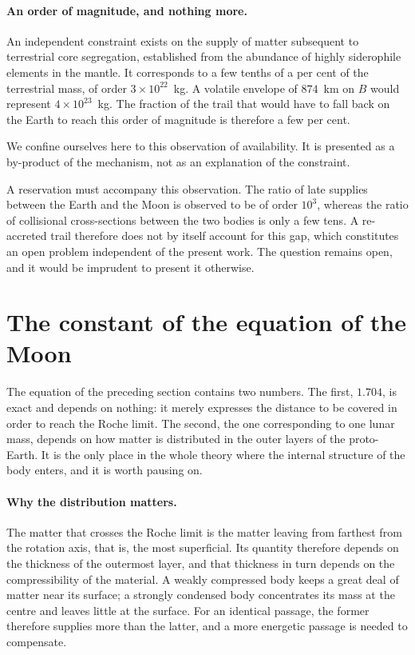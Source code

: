 \documentclass[11pt,a4paper,openany]{report}
\begin{document}
\paragraph{An order of magnitude, and nothing more.} An independent constraint exists on the supply
of matter subsequent to terrestrial core segregation, established from the abundance of highly
siderophile elements in the mantle. It corresponds to a few tenths of a per cent of the terrestrial
mass, of order $3\times10^{22}$~kg. A volatile envelope of $874$~km on $B$ would represent
$4\times10^{23}$~kg. The fraction of the trail that would have to fall back on the Earth to reach
this order of magnitude is therefore a few per cent.

We confine ourselves here to this observation of availability. It is presented as a by-product of the
mechanism, not as an explanation of the constraint.

\begin{controle}
A reservation must accompany this observation. The ratio of late supplies between the Earth and the
Moon is observed to be of order $10^{3}$, whereas the ratio of collisional cross-sections between the
two bodies is only a few tens. A re-accreted trail therefore does not by itself account for this
gap, which constitutes an open problem independent of the present work. The question remains open,
and it would be imprudent to present it otherwise.
\end{controle}

\section{The constant of the equation of the Moon}
\label{sec:constante-lune}

The equation of the preceding section contains two numbers. The first, $1.704$, is exact and
depends on nothing: it merely expresses the distance to be covered in order to reach the Roche
limit. The second, the one corresponding to one lunar mass, depends on how matter is distributed in
the outer layers of the proto-Earth. It is the only place in the whole theory where the internal
structure of the body enters, and it is worth pausing on.

\paragraph{Why the distribution matters.} The matter that crosses the Roche limit is the matter
leaving from farthest from the rotation axis, that is, the most superficial. Its quantity therefore
depends on the thickness of the outermost layer, and that thickness in turn depends on the
compressibility of the material. A weakly compressed body keeps a great deal of matter near its
surface; a strongly condensed body concentrates its mass at the centre and leaves little at the
surface. For an identical passage, the former therefore supplies more than the latter, and a more
energetic passage is needed to compensate.
\end{document}
